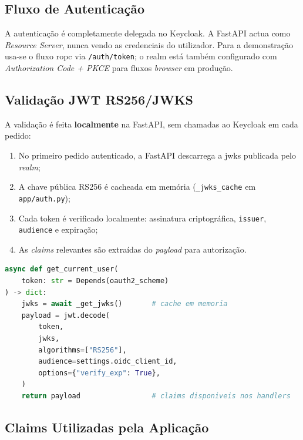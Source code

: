 \subsection{Fluxo de Autenticação}

A autenticação é completamente delegada no Keycloak. A FastAPI actua como \textit{Resource Server}, nunca vendo as credenciais do utilizador. Para a demonstração usa-se o fluxo \gls{ropc} via \texttt{/auth/token}; o realm está também configurado com \textit{Authorization Code + PKCE} para fluxos \textit{browser} em produção.

\subsection{Validação JWT RS256/JWKS}

A validação é feita \textbf{localmente} na FastAPI, sem chamadas ao Keycloak em cada pedido:

\begin{enumerate}
  \item No primeiro pedido autenticado, a FastAPI descarrega a \gls{jwks} publicada pelo \textit{realm};
  \item A chave pública RS256 é cacheada em memória (\texttt{\_jwks\_cache} em \texttt{app/auth.py});
  \item Cada token é verificado localmente: assinatura criptográfica, \texttt{issuer}, \texttt{audience} e expiração;
  \item As \textit{claims} relevantes são extraídas do \textit{payload} para autorização.
\end{enumerate}

\begin{lstlisting}[language=Python, caption={Validação JWT RS256 em app/auth.py},label={lst:jwt}]
async def get_current_user(
    token: str = Depends(oauth2_scheme)
) -> dict:
    jwks = await _get_jwks()       # cache em memoria
    payload = jwt.decode(
        token,
        jwks,
        algorithms=["RS256"],
        audience=settings.oidc_client_id,
        options={"verify_exp": True},
    )
    return payload                 # claims disponiveis nos handlers
\end{lstlisting}

\subsection{Claims Utilizadas pela Aplicação}

